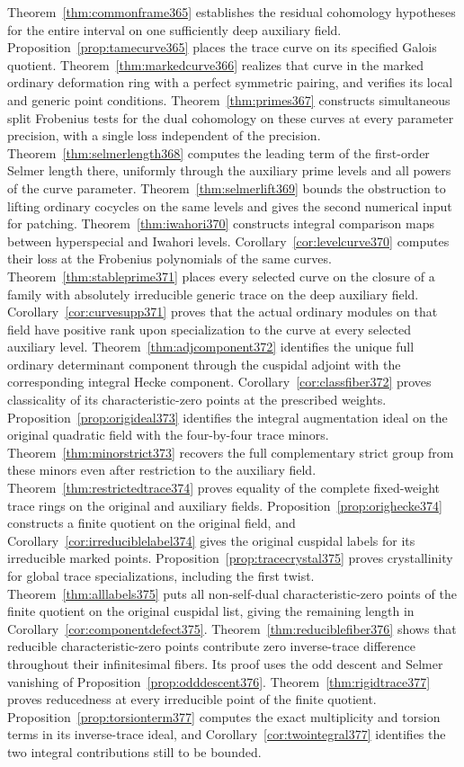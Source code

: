 \documentclass[a4paper,11pt]{article}
\theoremstyle{definition}
\theoremstyle{remark}
\numberwithin{equation}{section}
\begin{document}
Theorem~\ref{thm:commonframe365} establishes the residual cohomology hypotheses for the entire interval on one sufficiently deep auxiliary field. Proposition~\ref{prop:tamecurve365} places the trace curve on its specified Galois quotient. Theorem~\ref{thm:markedcurve366} realizes that curve in the marked ordinary deformation ring with a perfect symmetric pairing, and verifies its local and generic point conditions. Theorem~\ref{thm:primes367} constructs simultaneous split Frobenius tests for the dual cohomology on these curves at every parameter precision, with a single loss independent of the precision. Theorem~\ref{thm:selmerlength368} computes the leading term of the first-order Selmer length there, uniformly through the auxiliary prime levels and all powers of the curve parameter. Theorem~\ref{thm:selmerlift369} bounds the obstruction to lifting ordinary cocycles on the same levels and gives the second numerical input for patching. Theorem~\ref{thm:iwahori370} constructs integral comparison maps between hyperspecial and Iwahori levels. Corollary~\ref{cor:levelcurve370} computes their loss at the Frobenius polynomials of the same curves. Theorem~\ref{thm:stableprime371} places every selected curve on the closure of a family with absolutely irreducible generic trace on the deep auxiliary field. Corollary~\ref{cor:curvesupp371} proves that the actual ordinary modules on that field have positive rank upon specialization to the curve at every selected auxiliary level. Theorem~\ref{thm:adjcomponent372} identifies the unique full ordinary determinant component through the cuspidal adjoint with the corresponding integral Hecke component. Corollary~\ref{cor:classfiber372} proves classicality of its characteristic-zero points at the prescribed weights. Proposition~\ref{prop:origideal373} identifies the integral augmentation ideal on the original quadratic field with the four-by-four trace minors. Theorem~\ref{thm:minorstrict373} recovers the full complementary strict group from these minors even after restriction to the auxiliary field. Theorem~\ref{thm:restrictedtrace374} proves equality of the complete fixed-weight trace rings on the original and auxiliary fields. Proposition~\ref{prop:orighecke374} constructs a finite quotient on the original field, and Corollary~\ref{cor:irreduciblelabel374} gives the original cuspidal labels for its irreducible marked points. Proposition~\ref{prop:tracecrystal375} proves crystallinity for global trace specializations, including the first twist. Theorem~\ref{thm:alllabels375} puts all non-self-dual characteristic-zero points of the finite quotient on the original cuspidal list, giving the remaining length in Corollary~\ref{cor:componentdefect375}. Theorem~\ref{thm:reduciblefiber376} shows that reducible characteristic-zero points contribute zero inverse-trace difference throughout their infinitesimal fibers. Its proof uses the odd descent and Selmer vanishing of Proposition~\ref{prop:odddescent376}. Theorem~\ref{thm:rigidtrace377} proves reducedness at every irreducible point of the finite quotient. Proposition~\ref{prop:torsionterm377} computes the exact multiplicity and torsion terms in its inverse-trace ideal, and Corollary~\ref{cor:twointegral377} identifies the two integral contributions still to be bounded. 
\end{document}
